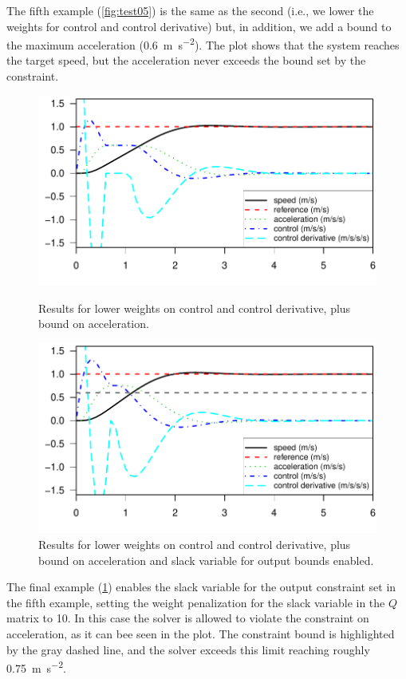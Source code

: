 \documentclass[10pt,a4paper]{article}
\def\pwidth{0.49}
\begin{document}
The fifth example (\cref{fig:test05}) is the same as the second (i.e., we lower the weights for control and control derivative) but, in addition, we add a bound to the maximum acceleration (\SI{0.6}{\meter\per\second\squared}).
The plot shows that the system reaches the target speed, but the acceleration never exceeds the bound set by the constraint.

\begin{figure}[h]
    \centering
    \begin{minipage}[t]{\pwidth\textwidth}
        \includegraphics[width=\textwidth]{./fig/test05}
        \caption{Results for lower weights on control and control derivative, plus bound on acceleration.}
        \label{fig:test05}
    \end{minipage}
    \hfill
    \begin{minipage}[t]{\pwidth\textwidth}
        \includegraphics[width=\textwidth]{./fig/test06}
        \caption{Results for lower weights on control and control derivative, plus bound on acceleration and slack variable for output bounds enabled.}
        \label{fig:test06}
    \end{minipage}
\end{figure}

The final example (\cref{fig:test06}) enables the slack variable for the output constraint set in the fifth example, setting the weight penalization for the slack variable in the $Q$ matrix to 10.
In this case the solver is allowed to violate the constraint on acceleration, as it can bee seen in the plot.
The constraint bound is highlighted by the gray dashed line, and the solver exceeds this limit reaching roughly \SI{0.75}{\meter\per\second\squared}.
\end{document}
